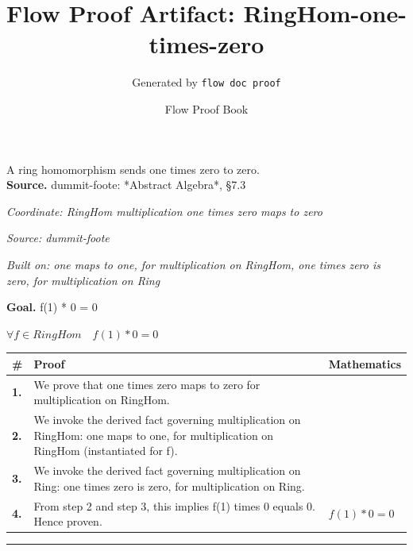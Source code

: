 \documentclass[11pt]{article}
\title{Flow Proof Artifact: RingHom-one-times-zero}
\author{Generated by \texttt{flow doc proof}}
\date{Flow Proof Book}
\theoremstyle{definition}
\begin{document}
\maketitle
A ring homomorphism sends one times zero to zero.\\[0.5em]
\textbf{Source.} dummit-foote: *Abstract Algebra*, §7.3\\[0.5em]
\bigskip
{}\par
\smallskip\noindent\textit{Coordinate: RingHom \cdot multiplication \cdot one times zero maps to zero}\par
\smallskip\noindent\textit{Source: dummit-foote}\par
\smallskip\noindent\textit{Built on: one maps to one, for multiplication on RingHom, one times zero is zero, for multiplication on Ring}\par
\medskip
\noindent\textbf{Goal.} f(1) * 0 = 0\par
\noindent$\displaystyle \forall f \in RingHom\quad f(1) * 0 = 0$\par
\medskip
\noindent
\begin{tabular}{@{} >{\raggedright\arraybackslash}p{} >{\raggedright\arraybackslash}p{} >{\raggedleft\arraybackslash}p{} @{}}
\textbf{\#} & \textbf{Proof} & \textbf{Mathematics} \\
\midrule
\textbf{1.} & We prove that one times zero maps to zero for multiplication on RingHom. & \\[0.45em]
\textbf{2.} & We invoke the derived fact governing multiplication on RingHom: one maps to one, for multiplication on RingHom (instantiated for f). & \\[0.45em]
\textbf{3.} & We invoke the derived fact governing multiplication on Ring: one times zero is zero, for multiplication on Ring. & \\[0.45em]
\textbf{4.} & From step 2 and step 3, this implies f(1) times 0 equals 0. Hence proven. & $\displaystyle f(1) * 0 = 0$ \\[0.45em]
\bottomrule
\end{tabular}
\label{thm:RingHom-multiplication-one_times_zero_maps_to_zero}
\par\medskip\hrule
\end{document}
